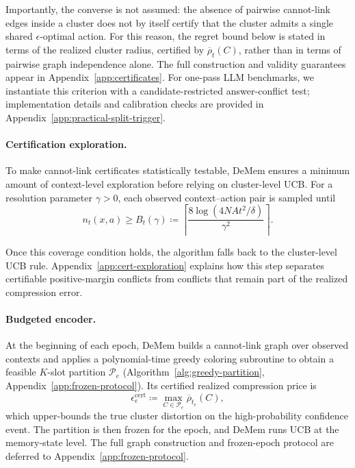 \documentclass{article}
\theoremstyle{plain}
\theoremstyle{definition}
\theoremstyle{remark}
\newcommand{\eps}{\epsilon}
\begin{document}
Importantly, the converse is not assumed: the absence of pairwise
cannot-link edges inside a cluster does not by itself certify that the
cluster admits a single shared \(\eps\)-optimal action. For this reason,
the regret bound below is stated in terms of the realized cluster radius,
certified by \(\overline\rho_t(C)\), rather than in terms of pairwise graph
independence alone. The full construction and validity guarantees appear in
Appendix~\ref{app:certificates}. For one-pass LLM benchmarks, we instantiate this criterion with a
candidate-restricted answer-conflict test; implementation details and
calibration checks are provided in Appendix~\ref{app:practical-split-trigger}.
\vspace{-0.5em}
\paragraph{Certification exploration.}
To make cannot-link certificates statistically testable, DeMem
ensures a minimum amount of context-level exploration before relying on
cluster-level UCB. For a resolution parameter \(\gamma>0\), each observed
context--action pair is sampled until
\[n_t(x,a)\ge
B_t(\gamma)
\coloneqq
\left\lceil
\frac{8\log(4NAt^2/\delta)}{\gamma^2}
\right\rceil .
\]

Once this coverage condition holds, the algorithm falls back to the
cluster-level UCB rule. Appendix~\ref{app:cert-exploration} explains how
this step separates certifiable positive-margin conflicts from conflicts
that remain part of the realized compression error.
\vspace{-0.5em}
\paragraph{Budgeted encoder.}
At the beginning of each epoch, DeMem builds a cannot-link graph
over observed contexts and applies a polynomial-time greedy coloring
subroutine to obtain a feasible \(K\)-slot partition \(\mathcal P_e\)
(Algorithm~\ref{alg:greedy-partition},
Appendix~\ref{app:frozen-protocol}). Its certified realized compression
price is
\[
\eps^{\mathrm{cert}}_e
\coloneqq
\max_{C\in\mathcal P_e}\overline\rho_{t_e}(C),
\]
which upper-bounds the true cluster distortion on the high-probability
confidence event. The partition is then frozen for the epoch, and
DeMem runs UCB at the memory-state level. The full graph
construction and frozen-epoch protocol are deferred to
Appendix~\ref{app:frozen-protocol}.

\vspace{-0.3em}
\end{document}
